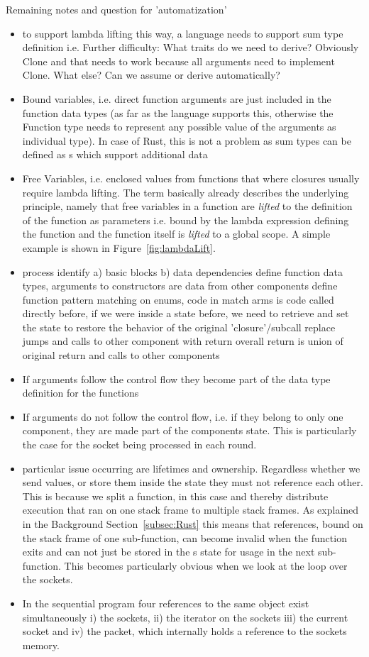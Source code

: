 Remaining notes and question for 'automatization'
\begin{itemize}
    \item to support lambda lifting this way, a language needs to support sum type definition i.e.
    Further difficulty: What traits do we need to derive? Obviously Clone and that needs to work because \means all arguments need to implement Clone. What else? Can we assume or derive automatically? 
    \item Bound variables, i.e. direct function arguments are just included in the function data types (as far as the language supports this, otherwise the Function type needs to represent any possible value of the arguments as individual type). In case of Rust, this is not a problem as sum types can be defined as s which support additional data
    \item Free Variables, i.e. enclosed values from functions that where closures usually require lambda lifting. The term basically already describes the underlying principle, namely that free variables in a function are \emph{lifted} to the definition of the function as parameters i.e. bound by the lambda expression defining the function and the function itself is \emph{lifted} to a global scope. A simple example is shown in Figure~\ref{fig:lambdaLift}.
    \item process \means identify a) basic blocks b) data dependencies \means define function data types, arguments to constructors are data from other components \means define  function \means pattern matching on enums, code in match arms is code called directly before, if we were inside a state before, we need to retrieve and set the state to restore the behavior of the original 'closure'/subcall \means replace jumps and calls to other component with return \means overall return is union of original return and calls to other components
    \item If arguments follow the control flow they become part of the data type definition for the functions
    \item If arguments do not follow the control flow, i.e. if they belong to only one component, they are made part of the components state. This is particularly the case for the socket being processed in each round.
    \item particular issue occurring are lifetimes and ownership. Regardless whether we send values, or store them inside the state they must not reference each other. This is because we split a function, in this case  and thereby distribute execution that ran on one stack frame to multiple stack frames. As explained in the Background Section~\ref{subsec:Rust} this means that references, bound on the stack frame of one sub-function, can become invalid when the function exits and can not just be stored in the \stack{}s state for usage in the next sub-function. This becomes particularly obvious when we look at the loop over the sockets. 
    \item In the sequential program four references to the same object exist simultaneously i) the sockets, ii) the iterator on the sockets iii) the current socket and iv) the packet, which internally holds a reference to the sockets memory. 
\end{itemize}
